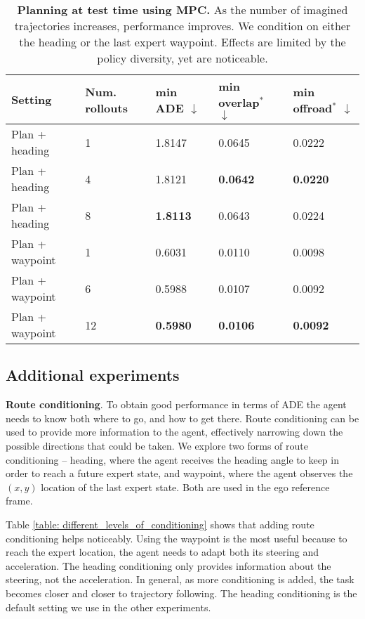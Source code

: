 \begin{table}[h]
    \small
    \centering
    \begin{tabular}[width=\textwidth]{ p{} | p{} | p{} p{} p{} } \toprule[1.5pt]
         \textbf{Setting} & Num. rollouts & min ADE $\downarrow$ & min \mbox{overlap$^\ast$ $\downarrow$} &  min offroad$^\ast$ $\downarrow$  \\
         \midrule[1pt]
          Plan + heading & 1 & 1.8147 & 0.0645 & 0.0222 \\     
          Plan + heading & 4 & 1.8121 & \textbf{0.0642} & \textbf{0.0220} \\
          Plan + heading & 8 & \textbf{1.8113} & 0.0643 & 0.0224 \\ 
          Plan + waypoint & 1 & 0.6031 & 0.0110 & 0.0098 \\     
          Plan + waypoint & 6 & 0.5988 & 0.0107 & 0.0092 \\
          Plan + waypoint & 12 & \textbf{0.5980} & \textbf{0.0106} & \textbf{0.0092} \\ 
         \bottomrule[1.5pt]
    \end{tabular}
    \captionsetup{aboveskip=0.3cm, belowskip=-0.3cm}
    \caption{\textbf{Planning at test time using MPC.} As the number of imagined trajectories increases, performance improves. We condition on either the heading or the last expert waypoint. Effects are limited by the policy diversity, yet are noticeable.}
    \label{table: planning}
\end{table}


\subsection{Additional experiments}

\textbf{Route conditioning}. To obtain good performance in terms of ADE the agent needs to know both where to go, and how to get there. Route conditioning can be used to provide more information to the agent, effectively narrowing down the possible directions that could be taken. We explore two forms of route conditioning -- heading, where the agent receives the heading angle to keep in order to reach a future expert state, and waypoint, where the agent observes the $(x, y)$ location of the last expert state. Both are used in the ego reference frame.

Table \ref{table: different_levels_of_conditioning} shows that adding route conditioning helps noticeably. Using the waypoint is the most useful because to reach the expert location, the agent needs to adapt both its steering and acceleration. The heading conditioning only provides information about the steering, not the acceleration. In general, as more conditioning is added, the task becomes closer and closer to trajectory following. The heading conditioning is the default setting we use in the other experiments.

